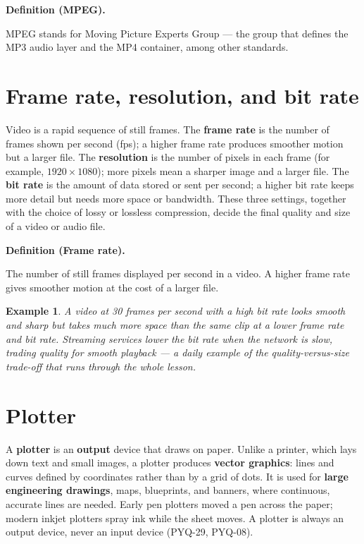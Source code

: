\documentclass[11pt]{article}
\newtheorem{example}{Example}[section]
\newenvironment{definitionbox}[1]{%
  \par\noindent\textbf{Definition (#1).}\ \itshape
}{\par\vspace{0.3em}}
\begin{document}
\begin{definitionbox}{MPEG}
MPEG stands for Moving Picture Experts Group --- the group that defines the
MP3 audio layer and the MP4 container, among other standards.
\end{definitionbox}

\section{Frame rate, resolution, and bit rate}
Video is a rapid sequence of still frames. The \textbf{frame rate} is the
number of frames shown per second (fps); a higher frame rate produces smoother
motion but a larger file. The \textbf{resolution} is the number of pixels in
each frame (for example, $1920 \times 1080$); more pixels mean a sharper image
and a larger file. The \textbf{bit rate} is the amount of data stored or sent
per second; a higher bit rate keeps more detail but needs more space or
bandwidth. These three settings, together with the choice of lossy or lossless
compression, decide the final quality and size of a video or audio file.

\begin{definitionbox}{Frame rate}
The number of still frames displayed per second in a video. A higher frame
rate gives smoother motion at the cost of a larger file.
\end{definitionbox}

\begin{example}
A video at 30 frames per second with a high bit rate looks smooth and sharp
but takes much more space than the same clip at a lower frame rate and bit
rate. Streaming services lower the bit rate when the network is slow, trading
quality for smooth playback --- a daily example of the quality-versus-size
trade-off that runs through the whole lesson.
\end{example}

\section{Plotter}
A \textbf{plotter} is an \textbf{output} device that draws on paper. Unlike a
printer, which lays down text and small images, a plotter produces
\textbf{vector graphics}: lines and curves defined by coordinates rather than
by a grid of dots. It is used for \textbf{large engineering drawings}, maps,
blueprints, and banners, where continuous, accurate lines are needed. Early
pen plotters moved a pen across the paper; modern inkjet plotters spray ink
while the sheet moves. A plotter is always an output device, never an input
device (PYQ-29, PYQ-08).
\end{document}
